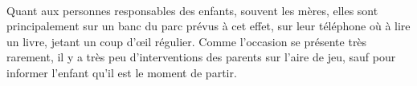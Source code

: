 \paragraph{} Quant aux personnes responsables des enfants, souvent les
mères, elles sont principalement sur un banc du parc prévus à cet effet, sur
leur téléphone où à lire un livre, jetant un coup d'œil régulier. Comme
l'occasion se présente très rarement, il y a très peu d'interventions des
parents sur l'aire de jeu, sauf pour informer l'enfant qu'il est le moment de
partir.


